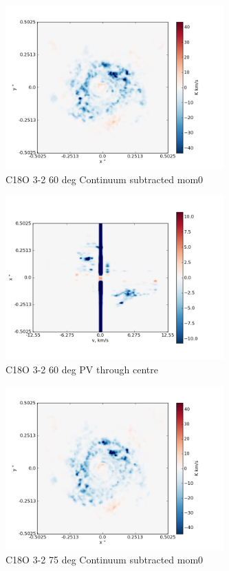 \documentclass[useAMS,usenatbib]{mn2e}
\begin{document}
\begin{figure}
 \includegraphics[width=84mm]{Figures/sim/imageC18O_3-2_60deg_contSub.png}

 \caption{C18O 3-2 60 deg Continuum subtracted mom0}
\end{figure}

%

\begin{figure}
 \includegraphics[width=84mm]{Figures/sim/imageC18O_3-2_60deg_PV_centre.png}

 \caption{C18O 3-2 60 deg PV through centre}
\end{figure}

\begin{figure}
 \includegraphics[width=84mm]{Figures/sim/imageC18O_3-2_75deg_contSub.png}

 \caption{C18O 3-2 75 deg Continuum subtracted mom0}
\end{figure}
\end{document}
